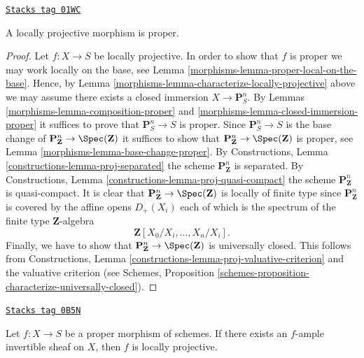 \begin{lemma}
\label{morphisms-lemma-locally-projective-proper}
\href{https://stacks.math.columbia.edu/tag/01WC}{\texttt{Stacks tag 01WC}}

A locally projective morphism is proper.
\end{lemma}

\begin{proof}

Let $f : X \to S$ be locally projective.
In order to show that $f$ is proper we may work locally on the
base, see Lemma \ref{morphisms-lemma-proper-local-on-the-base}.
Hence, by Lemma \ref{morphisms-lemma-characterize-locally-projective}
above we may assume there exists a closed immersion $X \to \mathbf{P}^n_S$.
By Lemmas \ref{morphisms-lemma-composition-proper}
and \ref{morphisms-lemma-closed-immersion-proper} it suffices to prove that
$\mathbf{P}^n_S \to S$ is proper. Since
$\mathbf{P}^n_S \to S$ is the base change of
$\mathbf{P}^n_{\mathbf{Z}} \to \Spec(\mathbf{Z})$ it suffices
to show that $\mathbf{P}^n_{\mathbf{Z}} \to \Spec(\mathbf{Z})$
is proper, see Lemma \ref{morphisms-lemma-base-change-proper}.
By Constructions, Lemma \ref{constructions-lemma-proj-separated} the scheme
$\mathbf{P}^n_{\mathbf{Z}}$ is separated.
By Constructions, Lemma \ref{constructions-lemma-proj-quasi-compact} the scheme
$\mathbf{P}^n_{\mathbf{Z}}$ is quasi-compact.
It is clear that $\mathbf{P}^n_{\mathbf{Z}} \to \Spec(\mathbf{Z})$
is locally of finite type since $\mathbf{P}^n_{\mathbf{Z}}$ is
covered by the affine opens $D_{+}(X_i)$ each of which is the
spectrum of the finite type $\mathbf{Z}$-algebra
$$
\mathbf{Z}[X_0/X_i, \ldots, X_n/X_i].
$$
Finally, we have to show that
$\mathbf{P}^n_{\mathbf{Z}} \to \Spec(\mathbf{Z})$
is universally closed. This follows from
Constructions, Lemma \ref{constructions-lemma-proj-valuative-criterion}
and the valuative criterion (see Schemes,
Proposition \ref{schemes-proposition-characterize-universally-closed}).
\end{proof}

\begin{lemma}
\label{morphisms-lemma-proper-ample-locally-projective}
\href{https://stacks.math.columbia.edu/tag/0B5N}{\texttt{Stacks tag 0B5N}}

Let $f : X \to S$ be a proper morphism of schemes. If there exists
an $f$-ample invertible sheaf on $X$, then $f$ is locally projective.
\end{lemma}

